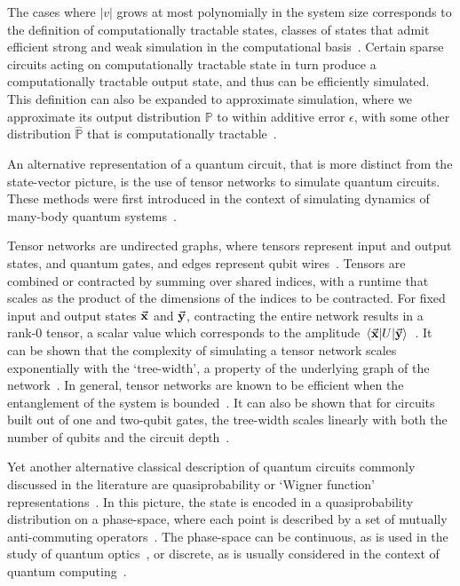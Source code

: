 The cases where $\left|v\right|$ grows at most polynomially in the system size corresponds to the definition of computationally tractable states, classes of states that admit efficient strong and weak simulation in the computational basis~\cite{VandenNest2009}. Certain sparse circuits acting on computationally tractable state in turn produce a computationally tractable output state, and thus can be efficiently simulated. This definition can also be expanded to approximate simulation, where we approximate its output distribution $\mathbb{P}$ to within additive error $\epsilon$, with some other distribution $\mathbb{\hat{P}}$ that is computationally tractable~\cite{Schwarz2013}.\par
An alternative representation of a quantum circuit, that is more distinct from the state-vector picture, is the use of tensor networks to simulate quantum circuits. These methods were first introduced in the context of simulating dynamics of many-body quantum systems~\cite{Vidal2003}.\par
Tensor networks are undirected graphs, where tensors represent input and output states, and quantum gates, and edges represent qubit wires~\cite{Markov2005}. Tensors are combined or contracted by summing over shared indices, with a runtime that scales as the product of the dimensions of the indices to be contracted. For fixed input and output states $\va{x}$ and $\va{y}$, contracting the entire network results in a rank-0 tensor, a scalar value which corresponds to the amplitude $\matrixel{\va{x}}{U}{\va{y}}$~\cite{Markov2005}. It can be shown that the complexity of simulating a tensor network scales exponentially with the `tree-width', a property of the underlying graph of the network~\cite{Markov2005}. In general, tensor networks are known to be efficient when the entanglement of the system is bounded~\cite{Vidal2003}. It can also be shown that for circuits built out of one and two-qubit gates, the tree-width scales linearly with both the number of qubits and the circuit depth~\cite{Markov2005}.\par
Yet another alternative classical description of quantum circuits commonly discussed in the literature are quasiprobability or `Wigner function' representations~\cite{Wootters1987}. In this picture, the state is encoded in a quasiprobability distribution on a phase-space, where each point is described by a set of mutually anti-commuting operators~\cite{Wootters1987}. The phase-space can be continuous, as is used in the study of quantum optics~\cite{Nielsen2000}, or discrete, as is usually considered in the context of quantum computing~\cite{Gross2006}.\par
